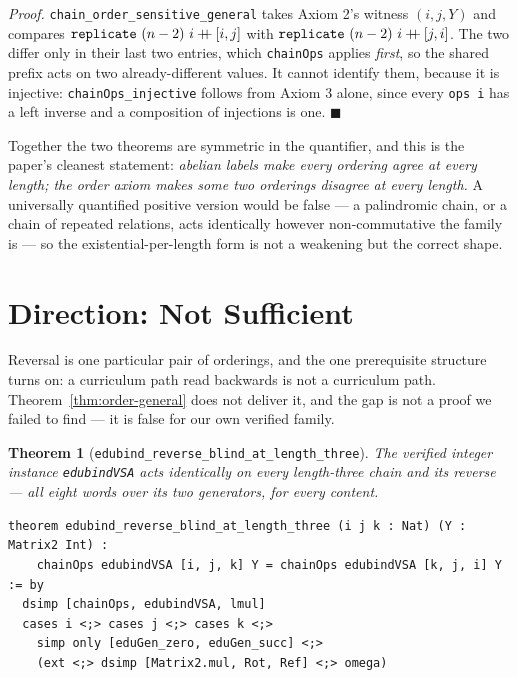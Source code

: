 \documentclass[10pt]{article}
\newtheorem{theorem}{Theorem}[section]
\begin{document}
\emph{Proof.} \texttt{chain\_order\_sensitive\_general} takes Axiom 2's witness $(i,j,Y)$ and compares $\texttt{replicate}\ (n-2)\ i \mathbin{+\mkern-8mu+} [i,j]$ with $\texttt{replicate}\ (n-2)\ i \mathbin{+\mkern-8mu+} [j,i]$. The two differ only in their last two entries, which \texttt{chainOps} applies \emph{first}, so the shared prefix acts on two already-different values. It cannot identify them, because it is injective: \texttt{chainOps\_injective} follows from Axiom 3 alone, since every \texttt{ops i} has a left inverse and a composition of injections is one. $\blacksquare$

Together the two theorems are symmetric in the quantifier, and this is the paper's cleanest statement: \emph{abelian labels make every ordering agree at every length; the order axiom makes some two orderings disagree at every length.} A universally quantified positive version would be false --- a palindromic chain, or a chain of repeated relations, acts identically however non-commutative the family is --- so the existential-per-length form is not a weakening but the correct shape.

\section{Direction: Not Sufficient}
\label{sec:direction}

Reversal is one particular pair of orderings, and the one prerequisite structure turns on: a curriculum path read backwards is not a curriculum path. Theorem~\ref{thm:order-general} does not deliver it, and the gap is not a proof we failed to find --- it is false for our own verified family.

\begin{theorem}[\texttt{edubind\_reverse\_blind\_at\_length\_three}]
\label{thm:blind}
The verified integer instance \texttt{edubindVSA} acts identically on every length-three chain and its reverse --- all eight words over its two generators, for every content.
\end{theorem}

\begin{lstlisting}
theorem edubind_reverse_blind_at_length_three (i j k : Nat) (Y : Matrix2 Int) :
    chainOps edubindVSA [i, j, k] Y = chainOps edubindVSA [k, j, i] Y := by
  dsimp [chainOps, edubindVSA, lmul]
  cases i <;> cases j <;> cases k <;>
    simp only [eduGen_zero, eduGen_succ] <;>
    (ext <;> dsimp [Matrix2.mul, Rot, Ref] <;> omega)
\end{lstlisting}
\end{document}
